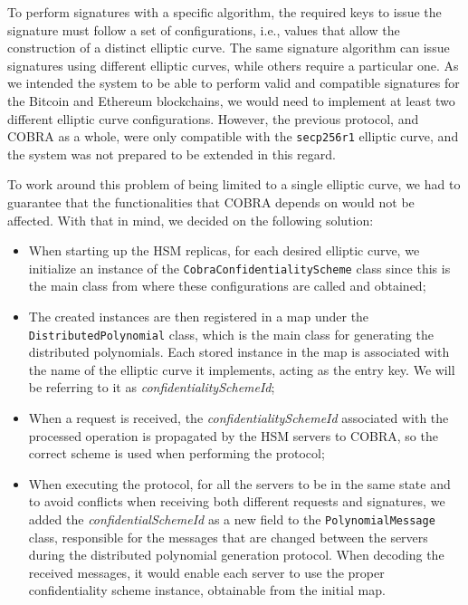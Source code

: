 To perform signatures with a specific algorithm, the required keys to issue the signature must follow a set of configurations, i.e., values that allow the construction of a distinct elliptic curve. The same signature algorithm can issue signatures using different elliptic curves, while others require a particular one. As we intended the system to be able to perform valid and compatible signatures for the Bitcoin and Ethereum blockchains, we would need to implement at least two different elliptic curve configurations. However, the previous protocol, and COBRA as a whole, were only compatible with the \texttt{secp256r1} elliptic curve, and the system was not prepared to be extended in this regard.

To work around this problem of being limited to a single elliptic curve, we had to guarantee that the functionalities that COBRA depends on would not be affected. With that in mind, we decided on the following solution:
\begin{itemize}
    \item When starting up the HSM replicas, for each desired elliptic curve, we initialize an instance of the \texttt{CobraConfidentialityScheme} class since this is the main class from where these configurations are called and obtained;
    
    \item The created instances are then registered in a map under the \texttt{DistributedPolynomial} class, which is the main class for generating the distributed polynomials. Each stored instance in the map is associated with the name of the elliptic curve it implements, acting as the entry key. We will be referring to it as \textit{confidentialitySchemeId};
    
    \item When a request is received, the \textit{confidentialitySchemeId} associated with the processed operation is propagated by the HSM servers to COBRA, so the correct scheme is used when performing the protocol;

    \item When executing the protocol, for all the servers to be in the same state and to avoid conflicts when receiving both different requests and signatures, we added the \textit{confidentialSchemeId} as a new field to the \texttt{PolynomialMessage} class, responsible for the messages that are changed between the servers during the distributed polynomial generation protocol. When decoding the received messages, it would enable each server to use the proper confidentiality scheme instance, obtainable from the initial map.
\end{itemize}%

